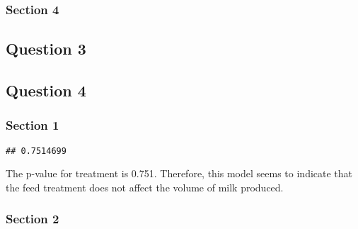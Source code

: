 \documentclass[]{article}
\newenvironment{Shaded}{\begin{snugshade}}{\end{snugshade}}
\newcommand{\KeywordTok}[1]{\textcolor[rgb]{0.13,0.29,0.53}{\textbf{#1}}}
\newcommand{\DataTypeTok}[1]{\textcolor[rgb]{0.13,0.29,0.53}{#1}}
\newcommand{\DecValTok}[1]{\textcolor[rgb]{0.00,0.00,0.81}{#1}}
\newcommand{\StringTok}[1]{\textcolor[rgb]{0.31,0.60,0.02}{#1}}
\newcommand{\OperatorTok}[1]{\textcolor[rgb]{0.81,0.36,0.00}{\textbf{#1}}}
\newcommand{\NormalTok}[1]{#1}
\begin{document}
\subsubsection{Section 4}\label{section-4}

\subsection{Question 3}\label{question-3}

\subsection{Question 4}\label{question-4}

\subsubsection{Section 1}\label{section-1-1}

\begin{Shaded}
\end{Shaded}

\begin{verbatim}
## 0.7514699
\end{verbatim}

The p-value for treatment is 0.751. Therefore, this model seems to
indicate that the feed treatment does not affect the volume of milk
produced.

\subsubsection{Section 2}\label{section-2-1}

\begin{Shaded}
\end{Shaded}
\end{document}
